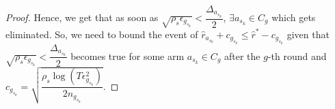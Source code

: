 \begin{proof}
\newline Hence, we get that as soon as $\sqrt{\rho_{s}\epsilon_{g_{s_{k}}}}<\dfrac{\Delta_{a_{s_{k}}}}{2}$, $\exists a_{s_{k}}\in C_{g}$ which gets eliminated.
\newline So, we need to bound the event of $\hat{r}_{a_{s_{k}}}+c_{g_{s_{k}}}\leq \hat{r}^{*}-c_{g_{s_{k}}}$ given that $\sqrt{\rho_{s}\epsilon_{g_{s_{k}}}}<\dfrac{\Delta_{a_{s_{k}}}}{2}$ becomes true for some arm $a_{s_{k}}\in C_{g}$ after the $g$-th round and $c_{g_{s_{k}}}=\sqrt{\dfrac{\rho_{s} \log (T\epsilon_{g_{s_{k}}}^{2})}{2 n_{g_{s_{k}}}}}$.


\end{proof}
